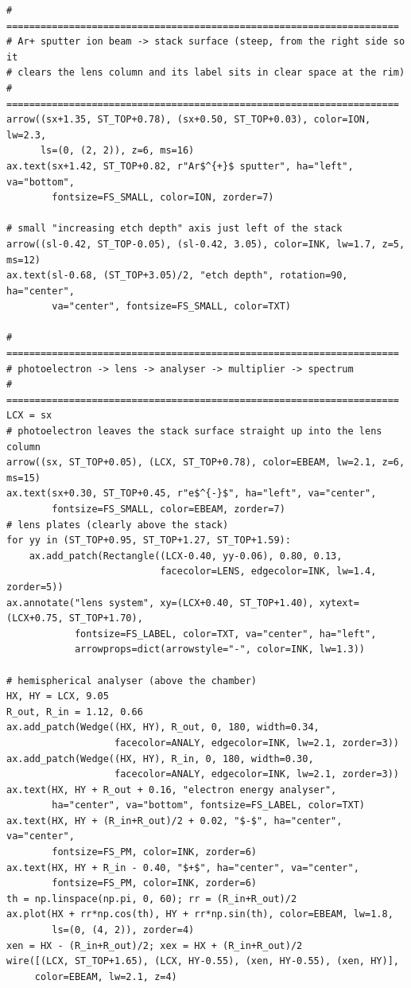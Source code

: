 \begin{lstlisting}[caption={schematics.ipynb code cell 1},label={lst:mrl-nb-schematics-1}]
# =====================================================================
# Ar+ sputter ion beam -> stack surface (steep, from the right side so it
# clears the lens column and its label sits in clear space at the rim)
# =====================================================================
arrow((sx+1.35, ST_TOP+0.78), (sx+0.50, ST_TOP+0.03), color=ION, lw=2.3,
      ls=(0, (2, 2)), z=6, ms=16)
ax.text(sx+1.42, ST_TOP+0.82, r"Ar$^{+}$ sputter", ha="left", va="bottom",
        fontsize=FS_SMALL, color=ION, zorder=7)

# small "increasing etch depth" axis just left of the stack
arrow((sl-0.42, ST_TOP-0.05), (sl-0.42, 3.05), color=INK, lw=1.7, z=5, ms=12)
ax.text(sl-0.68, (ST_TOP+3.05)/2, "etch depth", rotation=90, ha="center",
        va="center", fontsize=FS_SMALL, color=TXT)

# =====================================================================
# photoelectron -> lens -> analyser -> multiplier -> spectrum
# =====================================================================
LCX = sx
# photoelectron leaves the stack surface straight up into the lens column
arrow((sx, ST_TOP+0.05), (LCX, ST_TOP+0.78), color=EBEAM, lw=2.1, z=6, ms=15)
ax.text(sx+0.30, ST_TOP+0.45, r"e$^{-}$", ha="left", va="center",
        fontsize=FS_SMALL, color=EBEAM, zorder=7)
# lens plates (clearly above the stack)
for yy in (ST_TOP+0.95, ST_TOP+1.27, ST_TOP+1.59):
    ax.add_patch(Rectangle((LCX-0.40, yy-0.06), 0.80, 0.13,
                           facecolor=LENS, edgecolor=INK, lw=1.4, zorder=5))
ax.annotate("lens system", xy=(LCX+0.40, ST_TOP+1.40), xytext=(LCX+0.75, ST_TOP+1.70),
            fontsize=FS_LABEL, color=TXT, va="center", ha="left",
            arrowprops=dict(arrowstyle="-", color=INK, lw=1.3))

# hemispherical analyser (above the chamber)
HX, HY = LCX, 9.05
R_out, R_in = 1.12, 0.66
ax.add_patch(Wedge((HX, HY), R_out, 0, 180, width=0.34,
                   facecolor=ANALY, edgecolor=INK, lw=2.1, zorder=3))
ax.add_patch(Wedge((HX, HY), R_in, 0, 180, width=0.30,
                   facecolor=ANALY, edgecolor=INK, lw=2.1, zorder=3))
ax.text(HX, HY + R_out + 0.16, "electron energy analyser",
        ha="center", va="bottom", fontsize=FS_LABEL, color=TXT)
ax.text(HX, HY + (R_in+R_out)/2 + 0.02, "$-$", ha="center", va="center",
        fontsize=FS_PM, color=INK, zorder=6)
ax.text(HX, HY + R_in - 0.40, "$+$", ha="center", va="center",
        fontsize=FS_PM, color=INK, zorder=6)
th = np.linspace(np.pi, 0, 60); rr = (R_in+R_out)/2
ax.plot(HX + rr*np.cos(th), HY + rr*np.sin(th), color=EBEAM, lw=1.8,
        ls=(0, (4, 2)), zorder=4)
xen = HX - (R_in+R_out)/2; xex = HX + (R_in+R_out)/2
wire([(LCX, ST_TOP+1.65), (LCX, HY-0.55), (xen, HY-0.55), (xen, HY)],
     color=EBEAM, lw=2.1, z=4)


\end{lstlisting}
